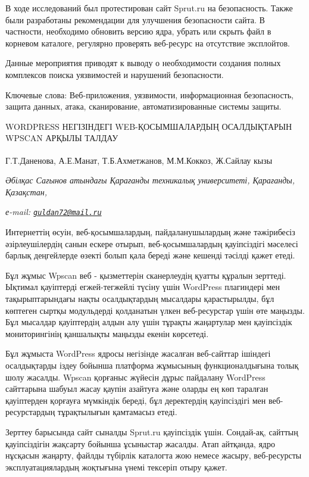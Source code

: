 В ходе исследований был протестирован сайт Sprut.ru на безопасность.
Также были разработаны рекомендации для улучшения безопасности сайта. В
частности, необходимо обновить версию ядра, убрать или скрыть файл в
корневом каталоге, регулярно проверять веб-ресурс на отсутствие
эксплойтов.

Данные мероприятия приводят к выводу о необходимости создания полных
комплексов поиска уязвимостей и нарушений безопасности.

Ключевые слова: Веб-приложения, уязвимости, информационная безопасность,
защита данных, атака, сканирование, автоматизированные системы защиты.

WORDPRESS НЕГІЗІНДЕГІ WEB-ҚОСЫМШАЛАРДЫҢ ОСАЛДЫҚТАРЫН WPSCAN АРҚЫЛЫ
ТАЛДАУ

Г.Т.Даненова\textsuperscript{\envelope }, А.Е.Манат, Т.Б.Ахметжанов, М.М.Коккоз,
Ж.Сайлау кызы

\emph{Әбілқас Сағынов атындағы Қарағанды техникалық университеті,
Қарағанды, Қазақстан,}

\emph{е-mail:
\href{mailto:guldan72@mail.ru}{\nolinkurl{guldan72@mail.ru}}}

Интернеттің өсуін, веб-қосымшалардың, пайдаланушылардың және тәжірибесіз
әзірлеушілердің санын ескере отырып, веб-қосымшалардың қауіпсіздігі
мәселесі барлық деңгейлерде өзекті болып қала береді және кешенді
тәсілді қажет етеді.

Бұл жұмыс Wpscan веб - қызметтерін сканерлеудің қуатты құралын зерттеді.
Ықтимал қауіптерді егжей-тегжейлі түсіну үшін WordPress плагиндері мен
тақырыптарындағы нақты осалдықтардың мысалдары қарастырылды, бұл
көптеген сыртқы модульдерді қолданатын үлкен веб-ресурстар үшін өте
маңызды. Бұл мысалдар қауіптердің алдын алу үшін тұрақты жаңартулар мен
қауіпсіздік мониторингінің қаншалықты маңызды екенін көрсетеді.

Бұл жұмыста WordPress ядросы негізінде жасалған веб-сайттар ішіндегі
осалдықтарды іздеу бойынша платформа жұмысының функционалдығына толық
шолу жасалды. Wpscan қорғаныс жүйесін дұрыс пайдалану WordPress
сайттарына шабуыл жасау қаупін азайтуға және оларды ең көп таралған
қауіптерден қорғауға мүмкіндік береді, бұл деректердің қауіпсіздігі мен
веб-ресурстардың тұрақтылығын қамтамасыз етеді.

Зерттеу барысында сайт сыналды Sprut.ru қауіпсіздік үшін. Сондай-ақ,
сайттың қауіпсіздігін жақсарту бойынша ұсыныстар жасалды. Атап айтқанда,
ядро нұсқасын жаңарту, файлды түбірлік каталогта жою немесе жасыру,
веб-ресурсты эксплуатациялардың жоқтығына үнемі тексеріп отыру қажет.

